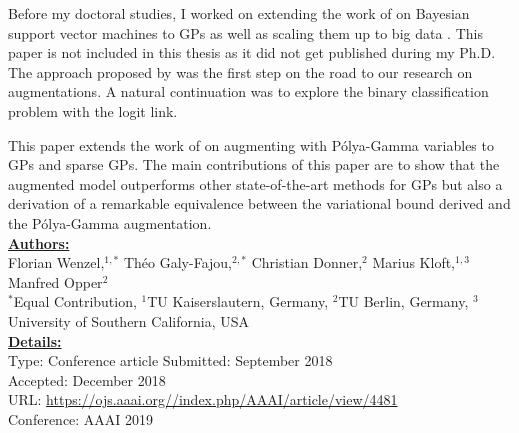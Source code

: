 


\graphicspath{{3/figures/}}

Before my doctoral studies, I worked on extending the work of \citet{henaoBayesianNonlinearSupport2014} on Bayesian support vector machines to \ac{GPs} as well as scaling them up to big data \cite{wenzel2017bayesian}.
This paper is not included in this thesis as it did not get published during my Ph.D.
The approach proposed by \citet{henaoBayesianNonlinearSupport2014} was the first step on the road to our research on augmentations.
A natural continuation was to explore the binary classification problem with the logit link.

This paper extends the work of \citet{polsonBayesianInferenceLogistic2012} on augmenting with P\'olya-Gamma variables to \ac{GPs} and sparse \ac{GPs}.
The main contributions of this paper are to show that the augmented model outperforms other state-of-the-art methods for \ac{GPs} but also a derivation of a remarkable equivalence between the variational bound derived \citet{jaakkolaBayesianParameterEstimation2000} and the P\'olya-Gamma augmentation.\\

\textbf{\underline{Authors:}}\\
Florian Wenzel,$^{1,*}$ Th\'eo Galy-Fajou,$^{2,*}$ Christian Donner,$^{2}$ Marius Kloft,$^{1,3}$ Manfred Opper$^2$\\
\small{$^*$Equal Contribution, $^1$TU Kaiserslautern, Germany, $^2$TU Berlin, Germany, $^3$University of Southern California, USA}\\

\textbf{\underline{Details:}}\\
Type: Conference article
Submitted: September 2018\\
Accepted: December 2018\\
URL: \url{https://ojs.aaai.org//index.php/AAAI/article/view/4481}\\
Conference: AAAI 2019\\

